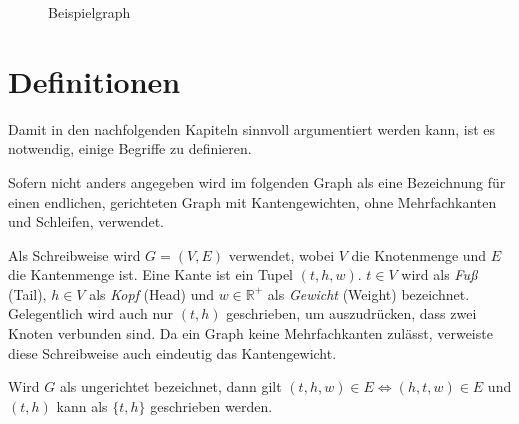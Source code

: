 \begin{figure}[ht]
    \caption{Beispielgraph}
    \label{graphs:fig:beispielgraph}
\end{figure}

\section{Definitionen}
Damit in den nachfolgenden Kapiteln sinnvoll argumentiert werden kann, ist es notwendig, einige Begriffe zu definieren.

\begin{definition}[Graph]
    Sofern nicht anders angegeben wird im folgenden Graph als eine Bezeichnung für einen endlichen, gerichteten Graph mit Kantengewichten, ohne Mehrfachkanten und Schleifen, verwendet.

    Als Schreibweise wird $G = (V, E)$ verwendet, wobei $V$ die Knotenmenge und $E$ die Kantenmenge ist. Eine Kante ist ein Tupel $(t, h, w)$. $t \in V$ wird als \emph{Fuß} (Tail), $h \in V$ als \emph{Kopf} (Head) und $w \in \mathbb{R}^+$ als \emph{Gewicht} (Weight) bezeichnet. Gelegentlich wird auch nur $(t, h)$ geschrieben, um auszudrücken, dass zwei Knoten verbunden sind. Da ein Graph keine Mehrfachkanten zulässt, verweiste diese Schreibweise auch eindeutig das Kantengewicht.

    Wird $G$ als ungerichtet bezeichnet, dann gilt $(t, h, w) \in E \Leftrightarrow (h, t, w) \in E$ und $(t, h)$ kann als $\{ t, h \}$ geschrieben werden.
\end{definition}

